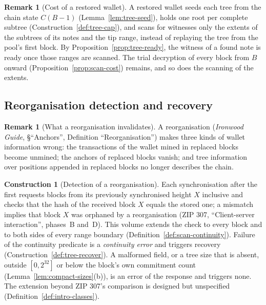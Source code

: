 \documentclass[11pt,a4paper]{article}
\theoremstyle{definition}
\newtheorem{construction}[theorem]{Construction}
\newtheorem{remark}[theorem]{Remark}
\begin{document}
\begin{remark}[Cost of a restored wallet]
A restored wallet seeds each tree from the chain state $C(B - 1)$
(Lemma~\ref{lem:tree-seed}), holds one root per complete subtree
(Construction~\ref{def:tree-cap}), and scans for witnesses only the extents
of the subtrees of its notes and the tip range, instead of replaying the
tree from the pool's first block. By Proposition~\ref{prop:tree-ready}, the
witness of a found note is ready once those ranges are scanned. The trial
decryption of every block from $B$ onward
(Proposition~\ref{prop:scan-cost}) remains, and so does the scanning of the
extents.
\end{remark}

\subsection{Reorganisation detection and recovery}\label{sec:tree-reorg}

\begin{remark}[What a reorganisation invalidates]
A reorganisation (\emph{Ironwood Guide}, \S``Anchors'', Definition
``Reorganisation'') makes three kinds of wallet information wrong: the
transactions of the wallet mined in replaced blocks become unmined; the anchors
of replaced blocks vanish; and tree information over positions appended in
replaced blocks no longer describes the chain.
\end{remark}

\begin{construction}[Detection of a reorganisation]
Each synchronisation after the first requests blocks from its previously
synchronised height $X$ inclusive and checks that the hash of the received
block $X$ equals the stored one; a mismatch implies that block $X$ was
orphaned by a reorganisation (ZIP 307, ``Client-server interaction'',
phases~B and~D). This volume extends the check to every block and to both
sides of every range boundary (Definition~\ref{def:scan-continuity}).
Failure of the continuity predicate is a \emph{continuity error} and
triggers recovery (Construction~\ref{def:tree-recover}). A malformed field,
or a tree size that is absent, outside $[0, 2^{32}]$ or below the block's
own commitment count (Lemma~\ref{lem:compact-sizes}(b)), is an error of the
response and triggers none. The extension beyond ZIP 307's comparison is
designed but unspecified (Definition~\ref{def:intro-classes}).
\end{construction}
\end{document}

